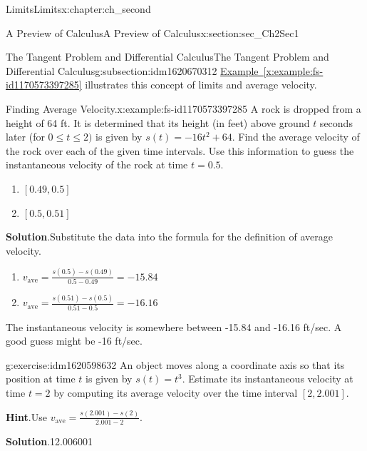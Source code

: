 \documentclass[oneside,10pt,]{book}
\newcommand{\blocktitlefont}{\relax}
\newcommand{\xreffont}{\relax}
\numberwithin{equation}{section}
\begin{document}
\begin{chapterptx}{Limits}{}{Limits}{}{}{x:chapter:ch_second}
\begin{sectionptx}{A Preview of Calculus}{}{A Preview of Calculus}{}{}{x:section:sec_Ch2Sec1}
\begin{subsectionptx}{The Tangent Problem and Differential Calculus}{}{The Tangent Problem and Differential Calculus}{}{}{g:subsection:idm1620670312}
\hyperref[x:example:fs-id1170573397285]{Example~{\xreffont\ref{x:example:fs-id1170573397285}}} illustrates this concept of limits and average velocity.%
\begin{example}{Finding Average Velocity.}{x:example:fs-id1170573397285}%
A rock is dropped from a height of 64 ft. It is determined that its height (in feet) above ground \(t \) seconds later (for \(0\leq t\leq 2)\) is given by \(s(t)=-16t^2+64.\) Find the average velocity of the rock over each of the given time intervals. Use this information to guess the instantaneous velocity of the rock at time \(t=0.5.\)%
%
\begin{enumerate}
\item{}\(\displaystyle [0.49,0.5]\)%
\item{}\(\displaystyle [0.5,0.51]\)%
\end{enumerate}
\par\smallskip%
\noindent\textbf{\blocktitlefont Solution}.\hypertarget{g:solution:idm1620603240}{}\quad{}Substitute the data into the formula for the definition of average velocity.%
%
\begin{enumerate}
\item{}\(\displaystyle v_{\text{ave}}= \frac{s(0.5)-s(0.49)}{0.5-0.49}=-15.84\)%
\item{}\(\displaystyle v_{\text{ave}}= \frac{s(0.51)-s(0.5)}{0.51-0.5}=-16.16\)%
\end{enumerate}
The instantaneous velocity is somewhere between -15.84 and -16.16 ft\slash{}sec. A good guess might be -16 ft\slash{}sec.%
\end{example}
\begin{inlineexercise}{}{g:exercise:idm1620598632}%
An object moves along a coordinate axis so that its position at time \(t \) is given by \(s(t)=t^3.\) Estimate its instantaneous velocity at time \(t=2\) by computing its average velocity over the time interval \([2,2.001].\)%
\par\smallskip%
\noindent\textbf{\blocktitlefont Hint}.\hypertarget{g:hint:idm1620599144}{}\quad{}Use \(v_{\text{ave}}= \frac{s(2.001)-s(2)}{2.001-2}.\)%
\par\smallskip%
\noindent\textbf{\blocktitlefont Solution}.\hypertarget{g:solution:idm1620593384}{}\quad{}12.006001%
\end{inlineexercise}%
\end{subsectionptx}
%
%
\typeout{************************************************}
\typeout{************************************************}

\end{sectionptx}
\end{chapterptx}
\end{document}
